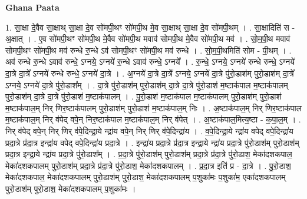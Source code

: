 \documentclass[17pt]{extarticle}
\begin{document}
\textbf{Ghana Paata } \newline

1. सा॒क्षा दे॒वैव सा॒क्षाथ् सा॒क्षा दे॒व सो॑मपी॒थꣳ सो॑मपी॒थ मे॒व सा॒क्षाथ् सा॒क्षा दे॒व सो॑मपी॒थम् । . सा॒क्षादिति॑ स - अ॒क्षात् । . ए॒व सो॑मपी॒थꣳ सो॑मपी॒थ मे॒वैव सो॑मपी॒थ मवाव॑ सोमपी॒थ मे॒वैव सो॑मपी॒थ मव॑ । . सो॒म॒पी॒थ मवाव॑ सोमपी॒थꣳ सो॑मपी॒थ मव॑ रुन्धे रु॒न्धे ऽव॑ सोमपी॒थꣳ सो॑मपी॒थ मव॑ रुन्धे । . सो॒म॒पी॒थमिति॑ सोम - पी॒थम् । . अव॑ रुन्धे रु॒न्धे ऽवाव॑ रुन्धे॒ ऽग्नये॒ ऽग्नये॑ रु॒न्धे ऽवाव॑ रुन्धे॒ ऽग्नये᳚ । . रु॒न्धे॒ ऽग्नये॒ ऽग्नये॑ रुन्धे रुन्धे॒ ऽग्नये॑ दा॒त्रे दा॒त्रे᳚ ऽग्नये॑ रुन्धे रुन्धे॒ ऽग्नये॑ दा॒त्रे । . अ॒ग्नये॑ दा॒त्रे दा॒त्रे᳚ ऽग्नये॒ ऽग्नये॑ दा॒त्रे पु॑रो॒डाश॑म् पुरो॒डाश॑म् दा॒त्रे᳚ ऽग्नये॒ ऽग्नये॑ दा॒त्रे पु॑रो॒डाश᳚म् । . दा॒त्रे पु॑रो॒डाश॑म् पुरो॒डाश॑म् दा॒त्रे दा॒त्रे पु॑रो॒डाश॑ म॒ष्टाक॑पाल म॒ष्टाक॑पालम् पुरो॒डाश॑म् दा॒त्रे दा॒त्रे पु॑रो॒डाश॑ म॒ष्टाक॑पालम् । . पु॒रो॒डाश॑ म॒ष्टाक॑पाल म॒ष्टाक॑पालम् पुरो॒डाश॑म् पुरो॒डाश॑ म॒ष्टाक॑पाल॒म् निर् णिर॒ष्टाक॑पालम् पुरो॒डाश॑म् पुरो॒डाश॑ म॒ष्टाक॑पाल॒म् निः । . अ॒ष्टाक॑पाल॒म् निर् णिर॒ष्टाक॑पाल म॒ष्टाक॑पाल॒म् निर् व॑पेद् वपे॒न् निर॒ष्टाक॑पाल म॒ष्टाक॑पाल॒म् निर् व॑पेत् । . अ॒ष्टाक॑पाल॒मित्य॒ष्टा - क॒पा॒ल॒म् । . निर् व॑पेद् वपे॒न् निर् णिर् व॑पे॒दिन्द्रा॒ये न्द्रा॑य वपे॒न् निर् णिर् व॑पे॒दिन्द्रा॑य । . व॒पे॒दिन्द्रा॒ये न्द्रा॑य वपेद् वपे॒दिन्द्रा॑य प्रदा॒त्रे प्र॑दा॒त्र इन्द्रा॑य वपेद् वपे॒दिन्द्रा॑य प्रदा॒त्रे । . इन्द्रा॑य प्रदा॒त्रे प्र॑दा॒त्र इन्द्रा॒ये न्द्रा॑य प्रदा॒त्रे पु॑रो॒डाश॑म् पुरो॒डाश॑म् प्रदा॒त्र इन्द्रा॒ये न्द्रा॑य प्रदा॒त्रे पु॑रो॒डाश᳚म् । . प्र॒दा॒त्रे पु॑रो॒डाश॑म् पुरो॒डाश॑म् प्रदा॒त्रे प्र॑दा॒त्रे पु॑रो॒डाश॒ मेका॑दशकपाल॒ मेका॑दशकपालम् पुरो॒डाश॑म् प्रदा॒त्रे प्र॑दा॒त्रे पु॑रो॒डाश॒ मेका॑दशकपालम् । . प्र॒दा॒त्र इति॑ प्र - दा॒त्रे । . पु॒रो॒डाश॒ मेका॑दशकपाल॒ मेका॑दशकपालम् पुरो॒डाश॑म् पुरो॒डाश॒ मेका॑दशकपालम् प॒शुका॑मः प॒शुका॑म॒ एका॑दशकपालम् पुरो॒डाश॑म् पुरो॒डाश॒ मेका॑दशकपालम् प॒शुका॑मः । \newline
\end{document}
